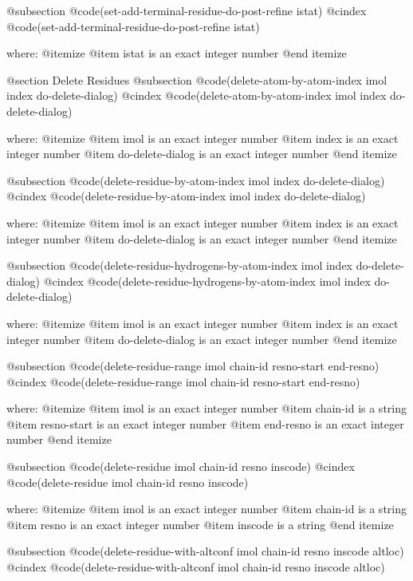 @subsection @code{(set-add-terminal-residue-do-post-refine istat)}
@cindex @code{(set-add-terminal-residue-do-post-refine istat)}
 
where: 
 @itemize 
     @item istat is an exact integer number
 @end itemize



@section Delete Residues 
@subsection @code{(delete-atom-by-atom-index imol index do-delete-dialog)}
@cindex @code{(delete-atom-by-atom-index imol index do-delete-dialog)}
 
where: 
 @itemize 
     @item imol is an exact integer number
     @item index is an exact integer number
     @item do-delete-dialog is an exact integer number
 @end itemize


@subsection @code{(delete-residue-by-atom-index imol index do-delete-dialog)}
@cindex @code{(delete-residue-by-atom-index imol index do-delete-dialog)}
 
where: 
 @itemize 
     @item imol is an exact integer number
     @item index is an exact integer number
     @item do-delete-dialog is an exact integer number
 @end itemize


@subsection @code{(delete-residue-hydrogens-by-atom-index imol index do-delete-dialog)}
@cindex @code{(delete-residue-hydrogens-by-atom-index imol index do-delete-dialog)}
 
where: 
 @itemize 
     @item imol is an exact integer number
     @item index is an exact integer number
     @item do-delete-dialog is an exact integer number
 @end itemize


@subsection @code{(delete-residue-range imol chain-id resno-start end-resno)}
@cindex @code{(delete-residue-range imol chain-id resno-start end-resno)}
 
where: 
 @itemize 
     @item imol is an exact integer number
     @item chain-id is a string
     @item resno-start is an exact integer number
     @item end-resno is an exact integer number
 @end itemize


@subsection @code{(delete-residue imol chain-id resno inscode)}
@cindex @code{(delete-residue imol chain-id resno inscode)}
 
where: 
 @itemize 
     @item imol is an exact integer number
     @item chain-id is a string
     @item resno is an exact integer number
     @item inscode is a string
 @end itemize


@subsection @code{(delete-residue-with-altconf imol chain-id resno inscode altloc)}
@cindex @code{(delete-residue-with-altconf imol chain-id resno inscode altloc)}
 
